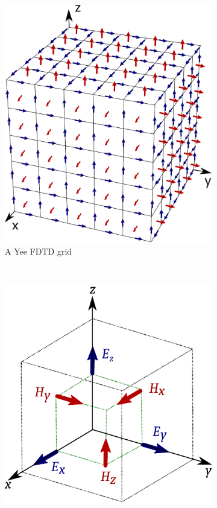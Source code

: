 \begin{figure}
    \centering
    \begin{subfigure}[b]{0.49\textwidth}
      \centering
        \includegraphics[scale=0.3]{img/analysis/fdtd_mesh}
        \caption{A Yee FDTD grid}
        \label{fig:fdtd-grid}
    \end{subfigure}
    ~
    \begin{subfigure}[b]{0.49\textwidth}
      \centering
        \includegraphics[scale=0.7]{img/analysis/yee_3d}

\end{subfigure}
\end{figure}
